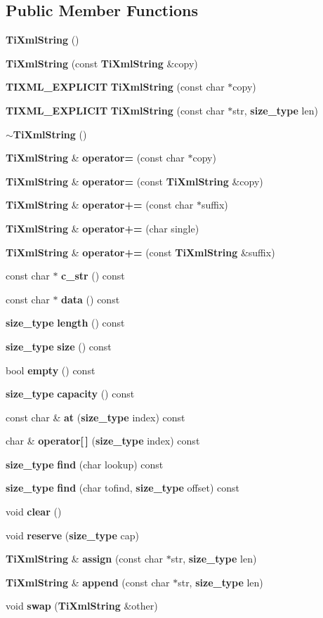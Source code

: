 \subsection*{Public Member Functions}
\begin{DoxyCompactItemize}
\item 
{\bf Ti\+Xml\+String} ()
\item 
{\bf Ti\+Xml\+String} (const {\bf Ti\+Xml\+String} \&copy)
\item 
{\bf T\+I\+X\+M\+L\+\_\+\+E\+X\+P\+L\+I\+C\+I\+T} {\bf Ti\+Xml\+String} (const char $\ast$copy)
\item 
{\bf T\+I\+X\+M\+L\+\_\+\+E\+X\+P\+L\+I\+C\+I\+T} {\bf Ti\+Xml\+String} (const char $\ast$str, {\bf size\+\_\+type} len)
\item 
{\bf $\sim$\+Ti\+Xml\+String} ()
\item 
{\bf Ti\+Xml\+String} \& {\bf operator=} (const char $\ast$copy)
\item 
{\bf Ti\+Xml\+String} \& {\bf operator=} (const {\bf Ti\+Xml\+String} \&copy)
\item 
{\bf Ti\+Xml\+String} \& {\bf operator+=} (const char $\ast$suffix)
\item 
{\bf Ti\+Xml\+String} \& {\bf operator+=} (char single)
\item 
{\bf Ti\+Xml\+String} \& {\bf operator+=} (const {\bf Ti\+Xml\+String} \&suffix)
\item 
const char $\ast$ {\bf c\+\_\+str} () const 
\item 
const char $\ast$ {\bf data} () const 
\item 
{\bf size\+\_\+type} {\bf length} () const 
\item 
{\bf size\+\_\+type} {\bf size} () const 
\item 
bool {\bf empty} () const 
\item 
{\bf size\+\_\+type} {\bf capacity} () const 
\item 
const char \& {\bf at} ({\bf size\+\_\+type} index) const 
\item 
char \& {\bf operator[$\,$]} ({\bf size\+\_\+type} index) const 
\item 
{\bf size\+\_\+type} {\bf find} (char lookup) const 
\item 
{\bf size\+\_\+type} {\bf find} (char tofind, {\bf size\+\_\+type} offset) const 
\item 
void {\bf clear} ()
\item 
void {\bf reserve} ({\bf size\+\_\+type} cap)
\item 
{\bf Ti\+Xml\+String} \& {\bf assign} (const char $\ast$str, {\bf size\+\_\+type} len)
\item 
{\bf Ti\+Xml\+String} \& {\bf append} (const char $\ast$str, {\bf size\+\_\+type} len)
\item 
void {\bf swap} ({\bf Ti\+Xml\+String} \&other)
\end{DoxyCompactItemize}
